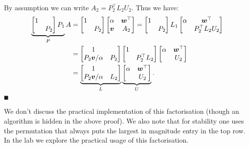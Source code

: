 By assumption we can write $A_2 = P_2^\ensuremath{\top} L_2 U_2$. Thus we have:
\begin{align*}
\underbrace{\begin{bmatrix} 1 \\
            & P_2 \end{bmatrix} P_1}_P A &= \begin{bmatrix} 1 \\
            & P_2 \end{bmatrix}  \begin{bmatrix} \alpha & \bm{{\mbox{\boldmath$w$\unboldmath}}}^\top \\
                        \bm{{\mbox{\boldmath$v$\unboldmath}}} & A_2
                        \end{bmatrix}  =
            \begin{bmatrix} 1 \\ & P_2 \end{bmatrix} L_1  \begin{bmatrix} \alpha & \bm{{\mbox{\boldmath$w$\unboldmath}}}^\top \\  & P_2^\top L_2  U_2 \end{bmatrix} \\
            &= \begin{bmatrix}
1 \\
P_2 \bm{{\mbox{\boldmath$v$\unboldmath}}}/\alpha & P_2 \end{bmatrix} \begin{bmatrix} 1 &  \\  &  P_2^\top L_2  \end{bmatrix}  \begin{bmatrix} \alpha & \bm{{\mbox{\boldmath$w$\unboldmath}}}^\top \\  &  U_2 \end{bmatrix} \\
&= \underbrace{\begin{bmatrix}
1 \\
P_2 \bm{{\mbox{\boldmath$v$\unboldmath}}}/\alpha & L_2  \end{bmatrix}}_L \underbrace{\begin{bmatrix} \alpha & \bm{{\mbox{\boldmath$w$\unboldmath}}}^\top \\  &  U_2 \end{bmatrix}}_U. \\
\end{align*}
\ensuremath{\QED}

We don't discuss the practical implementation of this factorisation (though an algorithm is hidden in the above proof). We also note that for stability one uses the permutation that always puts the largest in magnitude entry in the top row. In the lab we explore the practical usage of this factorisation.


